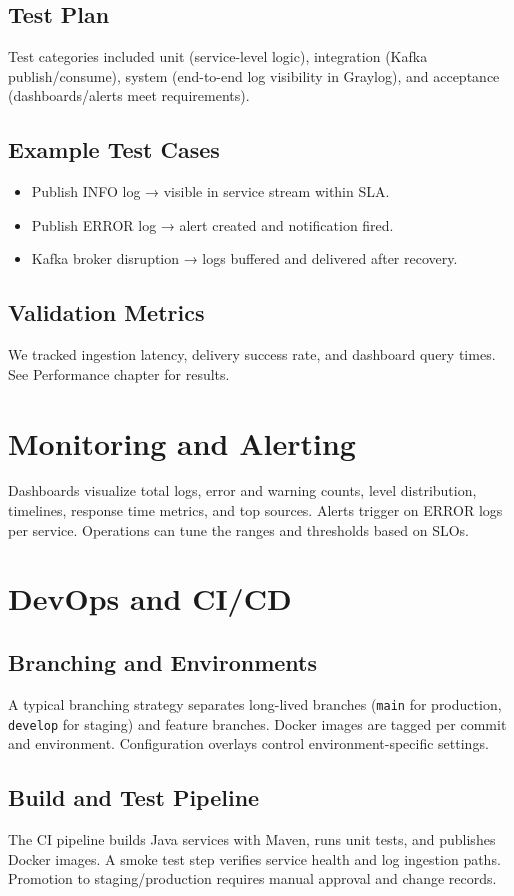 \documentclass[12pt,a4paper]{report}
\begin{document}
\section{Test Plan}
Test categories included unit (service-level logic), integration (Kafka publish/consume), system (end-to-end log visibility in Graylog), and acceptance (dashboards/alerts meet requirements).

\section{Example Test Cases}
\begin{itemize}[leftmargin=1.2cm]
  \item Publish INFO log → visible in service stream within SLA.
  \item Publish ERROR log → alert created and notification fired.
  \item Kafka broker disruption → logs buffered and delivered after recovery.
\end{itemize}

\section{Validation Metrics}
We tracked ingestion latency, delivery success rate, and dashboard query times. See Performance chapter for results.

\chapter{Monitoring and Alerting}
Dashboards visualize total logs, error and warning counts, level distribution, timelines, response time metrics, and top sources. Alerts trigger on ERROR logs per service. Operations can tune the ranges and thresholds based on SLOs.

\chapter{DevOps and CI/CD}
\section{Branching and Environments}
A typical branching strategy separates long-lived branches (\texttt{main} for production, \texttt{develop} for staging) and feature branches. Docker images are tagged per commit and environment. Configuration overlays control environment-specific settings.

\section{Build and Test Pipeline}
The CI pipeline builds Java services with Maven, runs unit tests, and publishes Docker images. A smoke test step verifies service health and log ingestion paths. Promotion to staging/production requires manual approval and change records.
\end{document}
